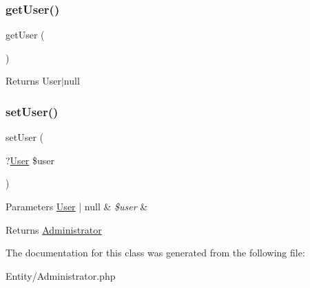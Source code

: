 \subsubsection{\texorpdfstring{getUser()}{getUser()}}
{\footnotesize\ttfamily get\+User (\begin{DoxyParamCaption}{ }\end{DoxyParamCaption})}

\begin{DoxyReturn}{Returns}
User$\vert$null 
\end{DoxyReturn}
\mbox{\label{class_app_1_1_entity_1_1_administrator_a406a111868b45aad6d4c8ab5b0c5bcb9}} 
\subsubsection{\texorpdfstring{setUser()}{setUser()}}
{\footnotesize\ttfamily set\+User (\begin{DoxyParamCaption}\item[{?\mbox{\hyperlink{class_app_1_1_entity_1_1_user}{User}}}]{\$user }\end{DoxyParamCaption})}


\begin{DoxyParams}[1]{Parameters}
\mbox{\hyperlink{class_app_1_1_entity_1_1_user}{User}} | null & {\em \$user} & \\
\hline
\end{DoxyParams}
\begin{DoxyReturn}{Returns}
\mbox{\hyperlink{class_app_1_1_entity_1_1_administrator}{Administrator}} 
\end{DoxyReturn}


The documentation for this class was generated from the following file\+:\begin{DoxyCompactItemize}
\item 
Entity/Administrator.\+php\end{DoxyCompactItemize}
